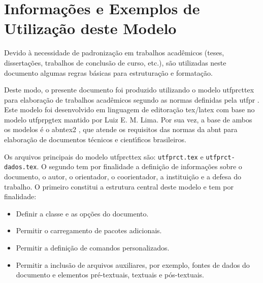 
\chapter{Informa\c{c}\~oes e Exemplos de Utiliza\c{c}\~ao deste Modelo}\label{cap:exemplo}

Devido \`a necessidade de padroniza\c{c}\~ao em trabalhos acad\^emicos (teses, disserta\c{c}\~oes, trabalhos de conclus\~ao de curso, etc.), s\~ao utilizadas neste documento algumas regras b\'asicas para estrutura\c{c}\~ao e formata\c{c}\~ao.

Deste modo, o presente documento foi produzido utilizando o modelo \gls{utfprcttex} para elabora\c{c}\~ao de trabalhos acad\^emicos segundo as normas definidas pela \gls{utfpr} \cite{UTFPR2017}. Este modelo foi desenvolvido em linguagem de editora\c{c}\~ao \gls{tex}/\gls{latex} com base no modelo \gls{utfprpgtex} \cite{LIMA2019} mantido por Luiz E. M. Lima. Por sua vez, a base de ambos os modelos \'e o \gls{abntex2} \cite{abnTeX2:2013}, que atende os requisitos das normas da \gls{abnt} para elabora\c{c}\~ao de documentos t\'ecnicos e cient\'{\i}ficos brasileiros.

Os arquivos principais do modelo \gls{utfprcttex} s\~ao: \texttt{utfprct.tex} e \texttt{utfprct-dados.tex}. O segundo tem por finalidade a defini\c{c}\~ao de informa\c{c}\~oes sobre o documento, o autor, o orientador, o coorientador, a institui\c{c}\~ao e a defesa do trabalho. O primeiro constitui a estrutura central deste modelo e tem por finalidade:

\begin{itemize}%
\item Definir a classe e as op\c{c}\~oes do documento.
\item Permitir o carregamento de pacotes adicionais.
\item Permitir a defini\c{c}\~ao de comandos personalizados.
\item Permitir a inclus\~ao de arquivos auxiliares, por exemplo, fontes de dados do documento e elementos pr\'e-textuais, textuais e p\'os-textuais.
\end{itemize}

